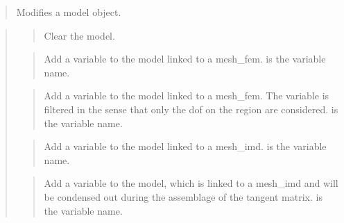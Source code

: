 \documentclass[a4paper,11pt,english]{sphinxmanual}
\begin{document}
\sphinxAtStartPar
{}
\begin{quote}

\sphinxAtStartPar
Modifies a model object.
\end{quote}

\sphinxAtStartPar
{}
\begin{quote}

\sphinxAtStartPar
{}
\begin{quote}

\sphinxAtStartPar
Clear the model.
\end{quote}

\sphinxAtStartPar
{}
\begin{quote}

\sphinxAtStartPar
Add a variable to the model linked to a mesh\_fem.  is the variable
name.
\end{quote}

\sphinxAtStartPar
{}
\begin{quote}

\sphinxAtStartPar
Add a variable to the model linked to a mesh\_fem. The variable is filtered
in the sense that only the dof on the region are considered.
 is the variable name.
\end{quote}

\sphinxAtStartPar
{}
\begin{quote}

\sphinxAtStartPar
Add a variable to the model linked to a mesh\_imd.  is the variable
name.
\end{quote}

\sphinxAtStartPar
{}
\begin{quote}

\sphinxAtStartPar
Add a variable to the model, which is linked to a mesh\_imd and will be
condensed out during the assemblage of the tangent matrix.  is
the variable name.
\end{quote}


\end{quote}
\end{document}
